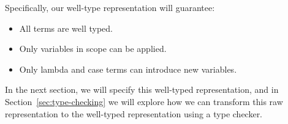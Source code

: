Specifically, our well-type representation will guarantee:
\begin{itemize}
\item All terms are well typed.
\item Only variables in scope can be applied.
\item Only lambda and case terms can introduce new variables.
\end{itemize}

In the next section, we will specify this well-typed representation, and in Section~\ref{sec:type-checking} we will explore how we can transform this raw representation to the well-typed representation using a type checker.
